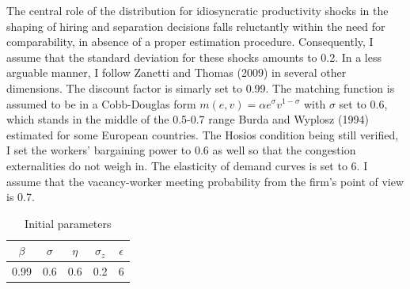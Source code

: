\documentclass[a4paper]{article}
\begin{document}
The central role of the distribution for idiosyncratic productivity shocks in the shaping of hiring and separation decisions falls reluctantly within the need for comparability, in absence of a proper estimation procedure. Consequently, I assume that the standard deviation for these shocks amounts to 0.2. In a less arguable manner, I follow Zanetti and Thomas (2009) in several other dimensions. The discount factor is simarly set to 0.99. The matching function is assumed to be in a Cobb-Douglas form $m\left(e,v\right) = \alpha e^{\sigma} v^{1-\sigma}$ with $\sigma$ set to 0.6, which stands in the middle of the 0.5-0.7 range Burda and Wyplosz (1994) estimated for some European countries. The Hosios condition being still verified, I set the workers' bargaining power to 0.6 as well so that the congestion externalities do not weigh in. The elasticity of demand curves is set to 6. I assume that the vacancy-worker meeting probability from the firm's point of view is 0.7.

\begin{table}[H]
\centering
\begin{tabular}{|c c c c c|}
\hline
$\beta$ & $\sigma$ & $\eta$ & $\sigma_z$ & $\epsilon$\\
\hline
0.99 & 0.6 & 0.6 & 0.2 & 6\\
\hline
\end{tabular}
\caption{Initial parameters \label{parameters}}
\end{table}
\end{document}
